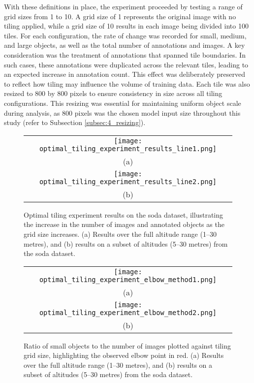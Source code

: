With these definitions in place, the experiment proceeded by testing a range of grid sizes from 1 to 10. A grid size of 1 represents the original image with no tiling applied, while a grid size of 10 results in each image being divided into 100 tiles. For each configuration, the rate of change was recorded for small, medium, and large objects, as well as the total number of annotations and images.
A key consideration was the treatment of annotations that spanned tile boundaries. In such cases, these annotations were duplicated across the relevant tiles, leading to an expected increase in annotation count. This effect was deliberately preserved to reflect how tiling may influence the volume of training data. Each tile was also resized to 800 by 800 pixels to ensure consistency in size across all tiling configurations. This resizing was essential for maintaining uniform object scale during analysis, as 800 pixels was the chosen model input size throughout this study (refer to Subsection \ref{subsec:4_resizing}).

\begin{figure}[!ht]
  \centering
  \begin{tabular}{c}
    \texttt{[image: optimal\_tiling\_experiment\_results\_line1.png]} \\
    \small (a) \\
    \addlinespace[1em]
    \texttt{[image: optimal\_tiling\_experiment\_results\_line2.png]} \\
    \small (b) \\
  \end{tabular}
  \caption{Optimal tiling experiment results on the \gls{soda} dataset, illustrating the increase in the number of images and annotated objects as the grid size increases. (a) Results over the full altitude range (1--30 metres), and (b) results on a subset of altitudes (5--30 metres) from the \gls{soda} dataset.}
  \label{fig:optimal_tiling_line}
\end{figure}

\begin{figure}[!ht]
  \centering
  \begin{tabular}{c}
    \texttt{[image: optimal\_tiling\_experiment\_elbow\_method1.png]} \\
    \small (a) \\
    \addlinespace[1em]
    \texttt{[image: optimal\_tiling\_experiment\_elbow\_method2.png]} \\
    \small (b) \\
  \end{tabular}
  \caption{Ratio of small objects to the number of images plotted against tiling grid size, highlighting the observed elbow point in red. (a) Results over the full altitude range (1--30 metres), and (b) results on a subset of altitudes (5--30 metres) from the \gls{soda} dataset.}
  \label{fig:elbow_plot}
\end{figure}

